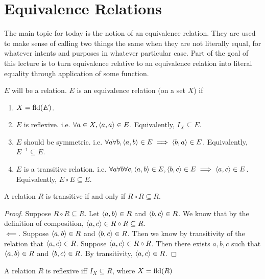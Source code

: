 
\section{Equivalence Relations}
\begin{rem}
The main topic for today is the notion of an equivalence relation. They are used to make sense of calling two things
the same when they are not literally equal, for whatever intents and purposes in whatever particular case. Part of the
goal of this lecture is to turn equivalence relative to an equivalence relation into literal equality through application
of some function.

\end{rem}
\begin{defn}
$E$ will be a relation. $E$ is an equivalence relation (on a set $X$) if
\begin{enumerate}
    \item $X = \text{fld}(E)$.
    \item $E$ is reflexive. i.e. $\forall a \in X, \langle a, a\rangle \in E$. Equivalently, $I_X \subseteq E$.
    \item $E$ should be symmetric. i.e. $\forall a \forall b, \langle a,  b\rangle \in E \implies \langle b, a \rangle \in E$. Equivalently, $E^{-1} \subseteq E$.
    \item $E$ is a transitive relation. i.e. $\forall a \forall b \forall c, \langle a, b\rangle \in E, \langle b, c\rangle \in E \implies \langle a, c\rangle \in E$. Equivalently, $E \circ E \subseteq E$.
\end{enumerate}
\end{defn}
\begin{prop}
A relation $R$ is transitive if and only if $R \circ R \subseteq R$.
\end{prop}
\begin{proof}
Suppose $R \circ R \subseteq R$. Let $\langle a, b\rangle \in R$ and $\langle b, c\rangle \in R$. We know that by the definition
of composition, $\langle a, c\rangle \in R \circ R \subseteq R$.\\
$\impliedby$. Suppose $\langle a, b\rangle \in R$ and $\langle b, c\rangle \in R$. Then we know by transitivity of the relation that 
$\langle a, c\rangle \in R$. Suppose $\langle a, c\rangle \in R \circ R$. Then there exists $a, b, c$ such that 
$\langle a, b\rangle \in R$ and $\langle b, c\rangle \in R$. By transitivity, $\langle a, c\rangle \in R$.
\end{proof}
\begin{prop}
A relation $R$ is reflexive iff $I_X \subseteq R$, where $X = \text{fld}(R)$
\end{prop}
